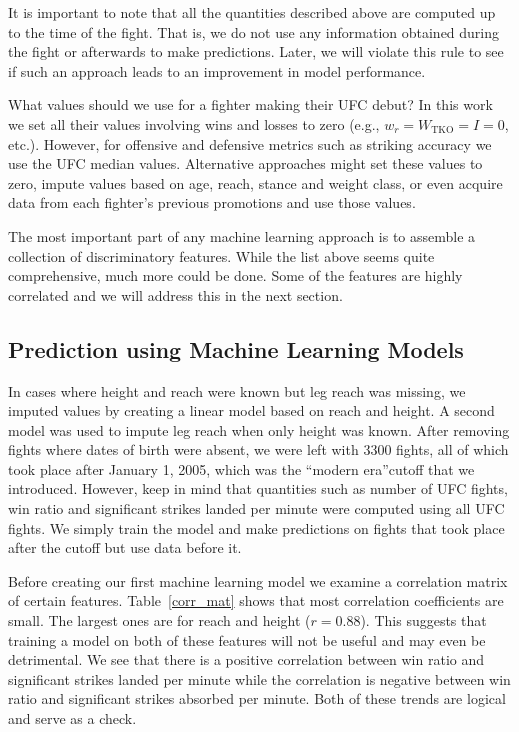 It is important to note that all the quantities described above are computed
up to the time of the fight. That is, we do not use any information
obtained during the fight or afterwards to make predictions.
Later, we will violate this rule to see if such an approach
leads to an improvement in model performance.

What values should we use for a fighter making their UFC debut? In this work
we set all their values involving wins and losses to
zero (e.g., $w_r=W_{\textrm{TKO}}=I=0$, etc.). However, for
offensive and defensive metrics such as striking accuracy we use the UFC median values.
Alternative approaches might set these values to zero, impute values based
on age, reach, stance and weight class, or even acquire data from
each fighter's previous promotions and use those
values.

The most important part of any machine learning approach is
to assemble a collection of discriminatory features. While the
list above seems quite comprehensive, much more could be done.
Some of the features are highly correlated and
we will address this in the next section.


\subsection*{Prediction using Machine Learning Models}

In cases where height and reach were known but leg reach
was missing, we imputed values by creating a linear model
based on reach and height. A second model was
used to impute leg reach when only height was known. After removing fights where
dates of birth were absent, we were left with 3300 fights,
all of which took place after January 1, 2005, which was
the ``modern era''cutoff that we introduced. However,
keep in mind that quantities such as number of UFC fights,
win ratio and significant strikes landed per minute were computed
using all UFC fights. We simply train the model and make
predictions on fights that took place after the cutoff but
use data before it.

Before creating our first machine learning model we examine a correlation
matrix of certain features. Table~\ref{corr_mat} shows that
most correlation coefficients are small. The largest ones
are for reach and height ($r=0.88$). This suggests that training a model
on both of these features will not be useful and may even be
detrimental. We see that there is a positive
correlation between win ratio and significant strikes landed
per minute while the correlation is negative between win ratio
and significant strikes absorbed per minute. Both of these trends
are logical and serve as a check.

